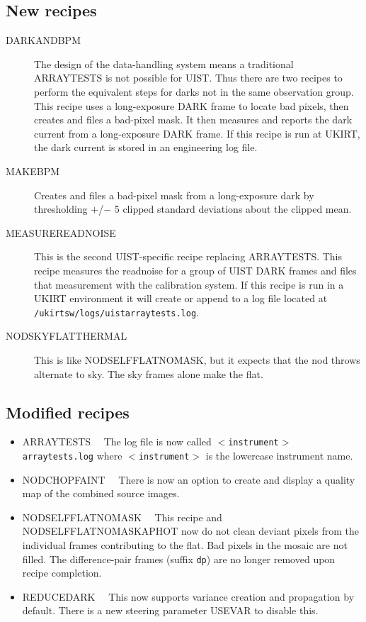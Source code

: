 \documentclass[twoside,11pt]{article}
\newcommand{\htmladdnormallink}[2]{#1}
\newcommand{\htmlref}[2]{#1}
\renewcommand{\_}{\texttt{\symbol{95}}}
\newcommand{\UKIRT}{\htmladdnormallink{UKIRT}{http://www.jach.hawaii.edu/JACpublic/UKIRT/}}
\newcommand{\UIST}{\htmladdnormallink{UIST}{http://www.jach.hawaii.edu/JACpublic/UKIRT/instruments/uist/uist.html}}
\begin{document}
\subsection{New recipes}
\begin{description}
  \item [\htmlref{DARK\_AND\_BPM}{DARK\_AND\_BPM}]
    The design of the data-handling system means a traditional
    ARRAY\_TESTS is not possible for \UIST.  Thus there are two recipes
    to perform the equivalent steps for darks not in the same
    observation group.  This recipe uses a long-exposure DARK frame to 
    locate bad pixels, then creates and files a bad-pixel mask.  It
    then measures and reports the dark current from a long-exposure DARK
    frame.  If this recipe is run at \UKIRT, the dark current is stored in
    an engineering log file.
  \item [\htmlref{MAKE\_BPM}{MAKE\_BPM}]
    Creates and files a bad-pixel mask from a long-exposure dark by
    thresholding $+$/$-$ 5 clipped standard deviations about the clipped
    mean.
  \item [\htmlref{MEASURE\_READNOISE}{MEASURE\_READNOISE}]
    This is the second UIST-specific recipe replacing ARRAY\_TESTS.
    This recipe measures the readnoise for a group of UIST DARK frames
    and files that measurement with the calibration system.  If this recipe 
    is run in a UKIRT environment it will create or append to a log file
    located at {\tt/ukirt\_sw/logs/uist\_array\_tests.log}.
  \item [\htmlref{NOD\_SKY\_FLAT\_THERMAL}{NOD\_SKY\_FLAT\_THERMAL}]
    This is like \htmlref{NOD\_SELF\_FLAT\_NO\_MASK}{NOD\_SELF\_FLAT\_NO\_MASK},
    but it expects that the nod throws alternate to sky.  The sky frames
    alone make the flat.
\end{description}

\subsection{Modified recipes}
\begin{itemize}
  \item \htmlref{ARRAY\_TESTS}{ARRAY\_TESTS}~~
    The log file is now called {\tt$<$instrument$>$\_array\_tests.log}
    where {\tt$<$instrument$>$} is the lowercase instrument name.
  \item \htmlref{NOD\_CHOP\_FAINT}{NOD\_CHOP\_FAINT}~~
    There is now an option to create and display a quality map of the
    combined source images.
  \item \htmlref{NOD\_SELF\_FLAT\_NO\_MASK}{NOD\_SELF\_FLAT\_NO\_MASK}~~
    This recipe and
    \htmlref{NOD\_SELF\_FLAT\_NO\_MASK\_APHOT}{NOD\_SELF\_FLAT\_NO\_MASK\_APHOT}
    now do not clean deviant pixels from the individual frames
    contributing to the flat.  Bad pixels in the mosaic are not filled.
    The difference-pair frames (suffix {\tt\_dp}) are no longer removed
    upon recipe completion.
  \item \htmlref{REDUCE\_DARK}{REDUCE\_DARK}~~
    This now supports variance creation and propagation by default.
    There is a new steering parameter USEVAR to disable this.
\end{itemize}
\end{document}
